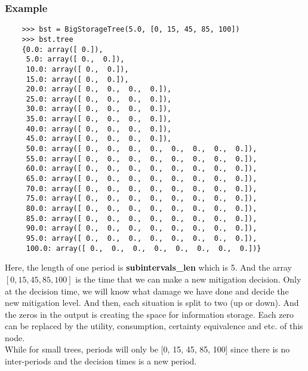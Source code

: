 \documentclass[12pt]{article}
\begin{document}
\subsubsection{Example}
\begin{verbatim}
    >>> bst = BigStorageTree(5.0, [0, 15, 45, 85, 100])
    >>> bst.tree
    {0.0: array([ 0.]),
     5.0: array([ 0.,  0.]),
     10.0: array([ 0.,  0.]),
     15.0: array([ 0.,  0.]),
     20.0: array([ 0.,  0.,  0.,  0.]),
     25.0: array([ 0.,  0.,  0.,  0.]),
     30.0: array([ 0.,  0.,  0.,  0.]),
     35.0: array([ 0.,  0.,  0.,  0.]),
     40.0: array([ 0.,  0.,  0.,  0.]),
     45.0: array([ 0.,  0.,  0.,  0.]),
     50.0: array([ 0.,  0.,  0.,  0.,  0.,  0.,  0.,  0.]),
     55.0: array([ 0.,  0.,  0.,  0.,  0.,  0.,  0.,  0.]),
     60.0: array([ 0.,  0.,  0.,  0.,  0.,  0.,  0.,  0.]),
     65.0: array([ 0.,  0.,  0.,  0.,  0.,  0.,  0.,  0.]),
     70.0: array([ 0.,  0.,  0.,  0.,  0.,  0.,  0.,  0.]),
     75.0: array([ 0.,  0.,  0.,  0.,  0.,  0.,  0.,  0.]),
     80.0: array([ 0.,  0.,  0.,  0.,  0.,  0.,  0.,  0.]),
     85.0: array([ 0.,  0.,  0.,  0.,  0.,  0.,  0.,  0.]),
     90.0: array([ 0.,  0.,  0.,  0.,  0.,  0.,  0.,  0.]),
     95.0: array([ 0.,  0.,  0.,  0.,  0.,  0.,  0.,  0.]),
     100.0: array([ 0.,  0.,  0.,  0.,  0.,  0.,  0.,  0.])}
\end{verbatim}
Here, the length of one period is \textbf{subintervals\_len} which is 5. And the array $[0, 15, 45, 85, 100]$ is the time that we can make a new mitigation decision. Only at the decision time, we will know what damage we have done and decide the new mitigation level. And then, each situation is split to two (up or down). And the zeros in the output is creating the space for information storage. Each zero can be replaced by the utility, consumption, certainty equivalence and etc. of this node.\\
While for small trees, periods will only be [0, 15, 45, 85, 100] since there is no inter-periods and the decision times is a new period.
\end{document}
